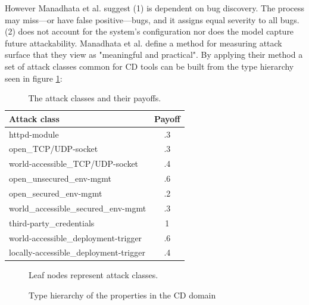 However Manadhata et al.\cite{as} suggest (1) is dependent on bug discovery. The process may miss---or have false positive---bugs, and it assigns equal severity to all bugs. (2) does not account for the system's configuration nor does the model capture future attackability. Manadhata et al. define\cite{as} a method for measuring attack surface that they view as "meaningful and practical". By applying their method a set of attack classes common for \acrshort{CD} tools can be built from the type hierarchy seen in figure \ref{fig:th}:

\begin{table}
    \begin{tabularx}{\textwidth}{| X | c |}
        \hline
        \textbf{Attack class}                  & \textbf{Payoff}\\ \hline \hline
        httpd-module                           & .3\\ \hline
        open\_TCP/UDP-socket                   & .3\\ \hline
        world-accessible\_TCP/UDP-socket       & .4\\ \hline
        open\_unsecured\_env-mgmt              & .6\\ \hline
        open\_secured\_env-mgmt                & .2\\ \hline
        world\_accessible\_secured\_env-mgmt   & .3\\ \hline
        third-party\_credentials               & 1 \\ \hline
        world-accessible\_deployment-trigger   & .6\\ \hline
        locally-accessible\_deployment-trigger & .4\\ \hline
    \end{tabularx}
    \caption{The attack classes and their payoffs.}
\end{table}

\begin{figure}[h]
\caption{Type hierarchy of the properties in the CD domain}
\medskip
\small
\centering 
Leaf nodes represent attack classes.
\label{fig:th}
\end{figure}

